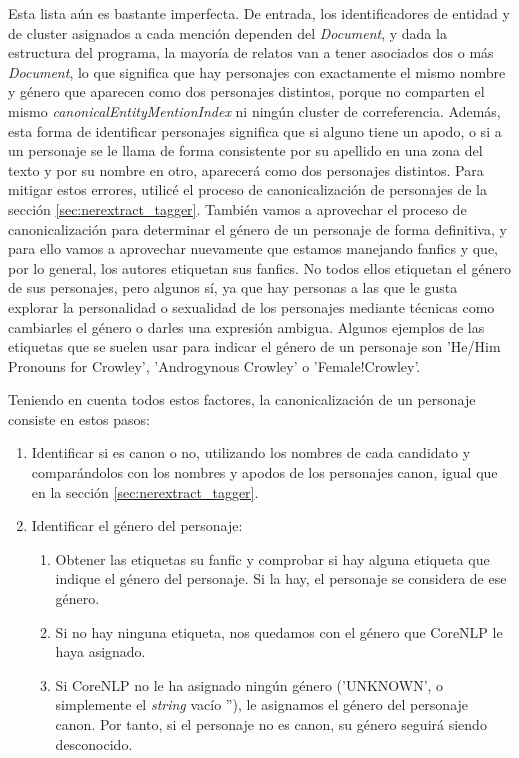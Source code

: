 \documentclass{pre-tfg}
\begin{document}
Esta lista aún es bastante imperfecta. De entrada, los identificadores de entidad y de cluster asignados a cada mención dependen del \textit{Document}, y dada la estructura del programa, la mayoría de relatos van a tener asociados dos o más \textit{Document}, lo que significa que hay personajes con exactamente el mismo nombre y género que aparecen como dos personajes distintos, porque no comparten el mismo \textit{canonicalEntityMentionIndex} ni ningún cluster de correferencia. Además, esta forma de identificar personajes significa que si alguno tiene un apodo, o si a un personaje se le llama de forma consistente por su apellido en una zona del texto y por su nombre en otro, aparecerá como dos personajes distintos. Para mitigar estos errores, utilicé el proceso de canonicalización de personajes de la sección \ref{sec:nerextract_tagger}.
También vamos a aprovechar el proceso de canonicalización para determinar el género de un personaje de forma definitiva, y para ello vamos a aprovechar nuevamente que estamos manejando fanfics y que, por lo general, los autores etiquetan sus fanfics. No todos ellos etiquetan el género de sus personajes, pero algunos sí, ya que hay personas a las que le gusta explorar la personalidad o sexualidad de los personajes mediante técnicas como cambiarles el género o darles una expresión ambigua. Algunos ejemplos de las etiquetas que se suelen usar para indicar el género de un personaje son 'He/Him Pronouns for Crowley', 'Androgynous Crowley' o 'Female!Crowley'.

Teniendo en cuenta todos estos factores, la canonicalización de un personaje consiste en estos pasos:
\begin{enumerate}
	\item Identificar si es canon o no, utilizando los nombres de cada candidato y comparándolos con los nombres y apodos de los personajes canon, igual que en la sección \ref{sec:nerextract_tagger}.
	
	\item Identificar el género del personaje:
	\begin{enumerate}
		\item  Obtener las etiquetas su fanfic y comprobar si hay alguna etiqueta que indique el género del personaje. Si la hay, el personaje se considera de ese género.
		\item Si no hay ninguna etiqueta, nos quedamos con el género que CoreNLP le haya asignado.
		\item Si CoreNLP no le ha asignado ningún género ('UNKNOWN', o simplemente el \textit{string} vacío ''), le asignamos el género del personaje canon. Por tanto, si el personaje no es canon, su género seguirá siendo desconocido.
	\end{enumerate}
\end{enumerate}
\end{document}
